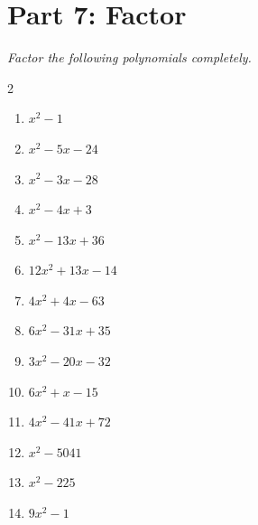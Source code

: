 \documentclass[11pt]{article}
\begin{document}
\section*{Part 7: Factor}
\noindent\textit{Factor the following polynomials completely.}
\begin{multicols}{2}
\begin{enumerate}
  \item $x^{2} - 1$
  \vspace{1.8cm}
  \item $x^{2} - 5x - 24$
  \vspace{1.8cm}
  \item $x^{2} - 3x - 28$
  \vspace{1.8cm}
  \item $x^{2} - 4x + 3$
  \vspace{1.8cm}
  \item $x^{2} - 13x + 36$
  \vspace{1.8cm}
  \item $12x^{2} + 13x - 14$
  \vspace{1.8cm}
  \item $4x^{2} + 4x - 63$
  \vspace{1.8cm}
  \item $6x^{2} - 31x + 35$
  \vspace{1.8cm}
  \item $3x^{2} - 20x - 32$
  \vspace{1.8cm}
  \item $6x^{2} + x - 15$
  \vspace{1.8cm}
  \item $4x^{2} - 41x + 72$
  \vspace{1.8cm}
  \item $x^{2} - 5041$
  \vspace{1.8cm}
  \item $x^{2} - 225$
  \vspace{1.8cm}
  \item $9x^{2} - 1$
  \vspace{1.8cm}
\end{enumerate}
\end{multicols}
\end{document}
